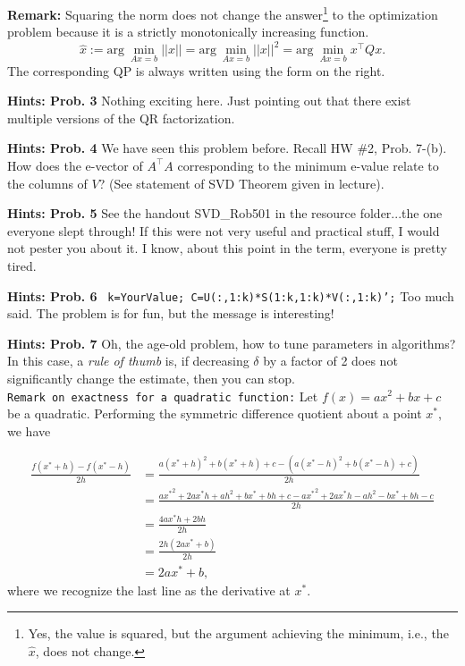 \documentclass[letterpaper]{article}
\begin{document}
\textbf{Remark:} Squaring the norm does not change the answer\footnote{Yes, the value is squared, but the argument achieving the minimum, i.e., the $\widehat{x}$, does not change.} to the optimization problem because it is a strictly monotonically increasing function.
 $$\widehat{x}:= \mathrm{arg}~\min_{Ax=b} ||x|| =  \mathrm{arg}~\min_{Ax=b} ||x||^2= \mathrm{arg}~\min_{Ax=b} x^\top Q x.$$
The corresponding QP is always written using the form on the right.

\vspace{1cm}

\noindent \textbf{Hints: Prob. 3 } Nothing exciting here. Just pointing out that there exist multiple versions of the QR factorization.

\vspace{1cm}

\noindent \textbf{Hints: Prob. 4 } We have seen this problem before. Recall HW \#2, Prob. 7-(b). How does  the e-vector of $A^\top A$ corresponding to the minimum e-value relate to the columns of $V$? (See statement of SVD Theorem given in lecture).

\vspace{1cm}

\noindent \textbf{Hints: Prob. 5 } See the handout SVD\_Rob501 in the resource folder...the one everyone slept through! If this were not very useful and practical stuff, I would not pester you about it. I know, about this point in the term, everyone is pretty tired.

\vspace{1cm}

\noindent \textbf{Hints: Prob. 6 } \texttt{ k=YourValue; C=U(:,1:k)*S(1:k,1:k)*V(:,1:k)';} Too much said. The problem is for fun, but the message is interesting!

\vspace{1cm}

\noindent \textbf{Hints: Prob. 7 } Oh, the age-old problem, how to tune parameters in algorithms? In this case, a \textit{rule of thumb} is, if decreasing $\delta$ by a factor of 2 does not significantly change the estimate, then you can stop.\\

\noindent \texttt{Remark on exactness for a quadratic function:} Let $f(x) = ax^2 + bx + c$   be a quadratic. Performing the symmetric difference quotient about a point $x^*$, we have

\begin{align*}
\frac{f(x^*+h) - f(x^*-h)}{2h} &= \frac{a(x^*+h)^2 +b(x^*+h) + c - (a(x^*-h)^2 +b(x^*-h) + c)}{2h} \\
&= \frac{a{x^*}^2 + 2ax^*h + ah^2 + bx^* + bh + c - a{x^*}^2 + 2ax^*h - ah^2 - bx^* + bh - c}{2h} \\
&= \frac{4ax^*h + 2bh}{2h} \\
&= \frac{2h(2ax^* + b)}{2h} \\
&= 2ax^* + b,
\end{align*}
where we recognize the last line as the derivative at $x^*$.
\end{document}
